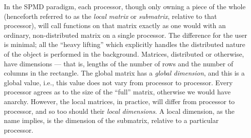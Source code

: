 \np
In the SPMD paradigm, each processor, though only owning a piece of the whole (henceforth referred to as the \emph{local matrix} or \emph{submatrix}, relative to that processor), will call functions on that matrix exactly as one would with an ordinary, non-distributed matrix on a single processor.  The difference for the user is minimal; all the ``heavy lifting'' which explicitly handles the distributed nature of the object is performed in the background.
\np
Matrices, distributed or otherwise, have dimensions --- that is, lengths of the number of rows and the number of columns in the rectangle.  The global matrix has a \emph{global dimension}, and this is a global value, i.e., this value does not vary from processor to processor.  Every processor agrees as to the size of the ``full'' matrix, otherwise we would have anarchy.  However, the local matrices, in practice, will differ from processor to processor, and so too should their \emph{local dimensions}.  A local dimension, as the name implies, is the dimension of the submatrix, relative to a particular processor.

